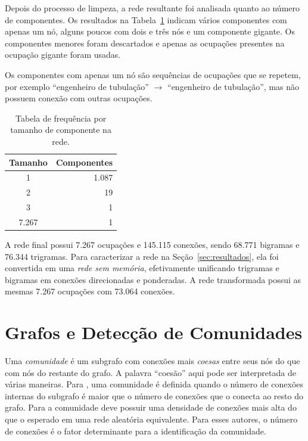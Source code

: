 \documentclass[
  article,
  11pt,
  a4paper,
  english,
  brazil,
  sumario=tradicional]{abntex2}
\begin{document}
Depois do processo de limpeza, a rede resultante foi analisada quanto ao número de componentes. Os resultados na Tabela~\ref{tab:componentes} indicam vários componentes com apenas um nó, alguns poucos com dois e três nós e um componente gigante. Os componentes menores foram descartados e apenas as ocupações presentes na ocupação gigante foram usadas.

Os componentes com apenas um nó são sequências de ocupações que se repetem, por exemplo \enquote{engenheiro de tubulação} $\to$ \enquote{engenheiro de tubulação}, mas não possuem conexão com outras ocupações.

\begin{table}
    \centering
    \begin{tabular}{@{} c r @{}}
        \toprule
        Tamanho & Componentes \\
        \midrule
        1        &  1.087 \\
        2        &  19 \\
        3        &  1 \\
        7.267 &  1 \\
        \bottomrule
    \end{tabular}
    \caption{Tabela de frequência por tamanho de componente na rede.}
    \label{tab:componentes}
\end{table}

A rede final possui 7.267 ocupações e 145.115 conexões, sendo 68.771 bigramas e 76.344 trigramas. Para caracterizar a rede na Seção~\ref{sec:resultados}, ela foi convertida em uma \textit{rede sem memória}, efetivamente unificando trigramas e bigramas em conexões direcionadas e ponderadas. A rede transformada possui as mesmas 7.267 ocupações com 73.064 conexões.

\section{Grafos e Detecção de Comunidades} \label{sec:comunidades}

Uma \textit{comunidade} é um subgrafo com conexões mais \textit{coesas} entre seus nós do que com nós do restante do grafo. A palavra \enquote{coesão} aqui pode ser interpretada de várias maneiras. Para , uma comunidade é definida quando o número de conexões internas do subgrafo é maior que o número de conexões que o conecta ao resto do grafo. Para  a comunidade deve possuir uma densidade de conexões mais alta do que o esperado em uma rede aleatória equivalente. Para esses autores, o número de conexões é o fator determinante para a identificação da comunidade.
\end{document}

